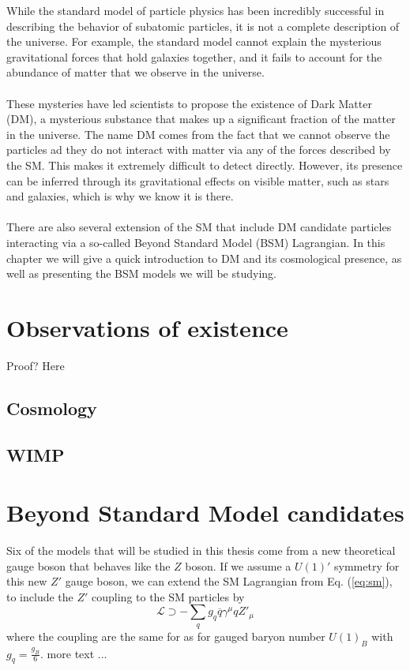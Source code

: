 \documentclass[12pt, a4paper]{book}
\begin{document}
While the standard model of particle physics has been incredibly successful in describing the behavior of subatomic particles, it is not a complete description of the universe. For example, the standard model cannot explain the mysterious gravitational forces that hold galaxies together, 
and it fails to account for the abundance of matter that we observe in the universe.\\
\\These mysteries have led scientists to propose the existence of Dark Matter (DM), a mysterious substance that makes up a significant fraction of the matter in the universe. The name DM comes from the fact that we cannot observe the particles ad they do not interact with matter via any of the 
forces described by the SM. This makes it extremely difficult to detect directly. However, its presence can be inferred through its gravitational effects on visible matter, such as stars and galaxies, which is why we know it is there.\\
\\There are also several extension of the SM that include DM candidate particles interacting via a so-called Beyond Standard Model (BSM) Lagrangian. In this chapter we will give a quick introduction to DM and its cosmological presence, as well as presenting the BSM models we will be studying.


\clearpage
\section{Observations of existence}
Proof? Here \cite{DM1, DM2}
\subsection{Cosmology}
\subsection{WIMP}

\section{Beyond Standard Model candidates}
Six of the models that will be studied in this thesis come from a new theoretical gauge boson that behaves like the $Z$ boson. If we assume a $U(1)'$ symmetry for this new $Z'$ gauge boson, 
we can extend the SM Lagrangian from Eq. (\ref{eq:sm}), to include the $Z'$ coupling to the SM particles by
\begin{equation}
    \mathcal{L}\supset -\sum_q g_q \overline{q}\gamma^\mu q Z'_\mu
\end{equation}
where the coupling are the same for as for gauged baryon number $U(1)_B$ with $g_q=\frac{g_B}{6}$. more text ... \cite{Zp_DM_candidate1, Zp_DM_candidate2, Zp_DM_candidate3}
\end{document}
